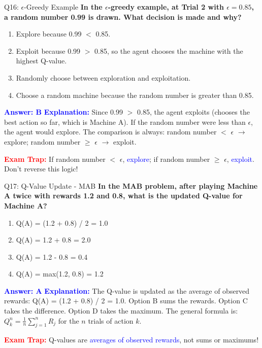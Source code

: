 \documentclass[8pt]{beamer}
\begin{document}
	\begin{frame}{Q16: $\epsilon$-Greedy Example}
		\fontsize{6.5}{7.5}\selectfont
		\textbf{In the $\epsilon$-greedy example, at Trial 2 with $\epsilon = 0.85$, a random number 0.99 is drawn. What decision is made and why?}
		
		\begin{enumerate}
			\item Explore because 0.99 $<$ 0.85.
			\item Exploit because 0.99 $>$ 0.85, so the agent chooses the machine with the highest Q-value.
			\item Randomly choose between exploration and exploitation.
			\item Choose a random machine because the random number is greater than 0.85.
		\end{enumerate}
		
		\vspace{0.1cm}
		\textcolor{blue}{\textbf{Answer: B}}
		\vspace{0.1cm}
		\textcolor{blue}{\textbf{Explanation:}} Since 0.99 $>$ 0.85, the agent exploits (chooses the best action so far, which is Machine A). If the random number were less than $\epsilon$, the agent would explore. The comparison is always: random number $<$ $\epsilon$ $\rightarrow$ explore; random number $\ge$ $\epsilon$ $\rightarrow$ exploit.
		
		\textcolor{red}{\textbf{Exam Trap:}} If random number $<$ $\epsilon$, \textcolor{blue}{explore}; if random number $\ge$ $\epsilon$, \textcolor{blue}{exploit}. Don't reverse this logic!
	\end{frame}
	
	\begin{frame}{Q17: Q-Value Update - MAB}
		\fontsize{6.5}{7.5}\selectfont
		\textbf{In the MAB problem, after playing Machine A twice with rewards 1.2 and 0.8, what is the updated Q-value for Machine A?}
		
		\begin{enumerate}
			\item Q(A) = (1.2 + 0.8) / 2 = 1.0
			\item Q(A) = 1.2 + 0.8 = 2.0
			\item Q(A) = 1.2 - 0.8 = 0.4
			\item Q(A) = max(1.2, 0.8) = 1.2
		\end{enumerate}
		
		\vspace{0.1cm}
		\textcolor{blue}{\textbf{Answer: A}}
		\vspace{0.1cm}
		\textcolor{blue}{\textbf{Explanation:}} The Q-value is updated as the average of observed rewards: Q(A) = (1.2 + 0.8) / 2 = 1.0. Option B sums the rewards. Option C takes the difference. Option D takes the maximum. The general formula is: $Q_k^n = \frac{1}{n}\sum_{j=1}^n R_j$ for the $n$ trials of action $k$.
		
		\textcolor{red}{\textbf{Exam Trap:}} Q-values are \textcolor{blue}{averages of observed rewards}, not sums or maximums!
	\end{frame}
	
\end{document}

